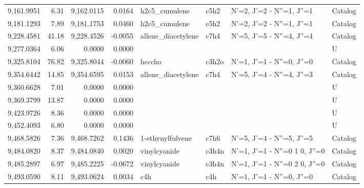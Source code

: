 \begin{longtable}{rrrrllll}
 9,161.9951 &      6.31 &        9,162.0115 &    0.0164 &               h2c5_cumulene &    c5h2 &            N'=2, J'=2 - N''=1, J''=1 &    Catalog \\
 9,181.1293 &      7.89 &        9,181.1753 &    0.0460 &               h2c5_cumulene &    c5h2 &            N'=2, J'=2 - N''=1, J''=1 &    Catalog \\
 9,228.4581 &     41.18 &        9,228.4526 &   -0.0055 &          allene_diacetylene &    c7h4 &            N'=5, J'=5 - N''=4, J''=4 &    Catalog \\
 9,277.0364 &      6.06 &            0.0000 &    0.0000 &                             &         &                                      &          U \\
 9,325.8104 &     76.82 &        9,325.8044 &   -0.0060 &                      hcccho &   c3h2o &            N'=1, J'=1 - N''=0, J''=0 &    Catalog \\
 9,354.6442 &     14.85 &        9,354.6595 &    0.0153 &          allene_diacetylene &    c7h4 &            N'=5, J'=4 - N''=4, J''=3 &    Catalog \\
 9,360.6628 &      7.01 &            0.0000 &    0.0000 &                             &         &                                      &          U \\
 9,369.3799 &     13.87 &            0.0000 &    0.0000 &                             &         &                                      &          U \\
 9,423.9726 &      8.36 &            0.0000 &    0.0000 &                             &         &                                      &          U \\
 9,452.4093 &      6.80 &            0.0000 &    0.0000 &                             &         &                                      &          U \\
 9,468.5826 &      7.36 &        9,468.7262 &    0.1436 &            1-ethynylfulvene &    c7h6 &            N'=5, J'=4 - N''=5, J''=5 &    Catalog \\
 9,484.0820 &      8.37 &        9,484.0840 &    0.0020 &                vinylcyanide &   c3h4n &      N'=1, J'=1 - N''=0 1   0, J''=0 &    Catalog \\
 9,485.2897 &      6.97 &        9,485.2225 &   -0.0672 &                vinylcyanide &   c3h4n &      N'=1, J'=1 - N''=0 2   0, J''=0 &    Catalog \\
 9,493.0590 &      8.11 &        9,493.0624 &    0.0034 &                         c4h &     c4h &            N'=1, J'=1 - N''=0, J''=0 &    Catalog \\

\end{longtable}

